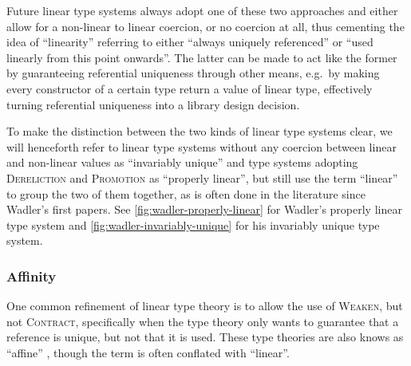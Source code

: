 Future linear type systems \citep{goos_observers_1992} \citep{atkey_syntax_2018} \citep{bernardy_linear_2018} \citep{brady_idris_2021} \citep{choudhury_graded_2021} \citep{li_linear_2022} \citep{spiwack_linearly_2022} always adopt one of these two approaches and either allow for a non-linear to linear coercion, or no coercion at all, thus cementing the idea of ``linearity'' referring to either ``always uniquely referenced'' or ``used linearly from this point onwards''. The latter can be made to act like the former by guaranteeing referential uniqueness through other means, e.g.\ by making every constructor of a certain type return a value of linear type, effectively turning referential uniqueness into a library design decision.

To make the distinction between the two kinds of linear type systems clear, we will henceforth refer to linear type systems without any coercion between linear and non-linear values as ``invariably unique'' and type systems adopting \textsc{Dereliction} and \textsc{Promotion} as ``properly linear'', but still use the term ``linear'' to group the two of them together, as is often done in the literature since Wadler's first papers. See \cref{fig:wadler-properly-linear} for Wadler's properly linear type system and \cref{fig:wadler-invariably-unique} for his invariably unique type system.

\subsubsection{Affinity}
One common refinement of linear type theory is to allow the use of \textsc{Weaken}, but not \textsc{Contract}, specifically when the type theory only wants to guarantee that a reference is unique, but not that it is used. These type theories are also knows as ``affine'' \citep{tov_practical_2011}, though the term is often conflated with ``linear''.

